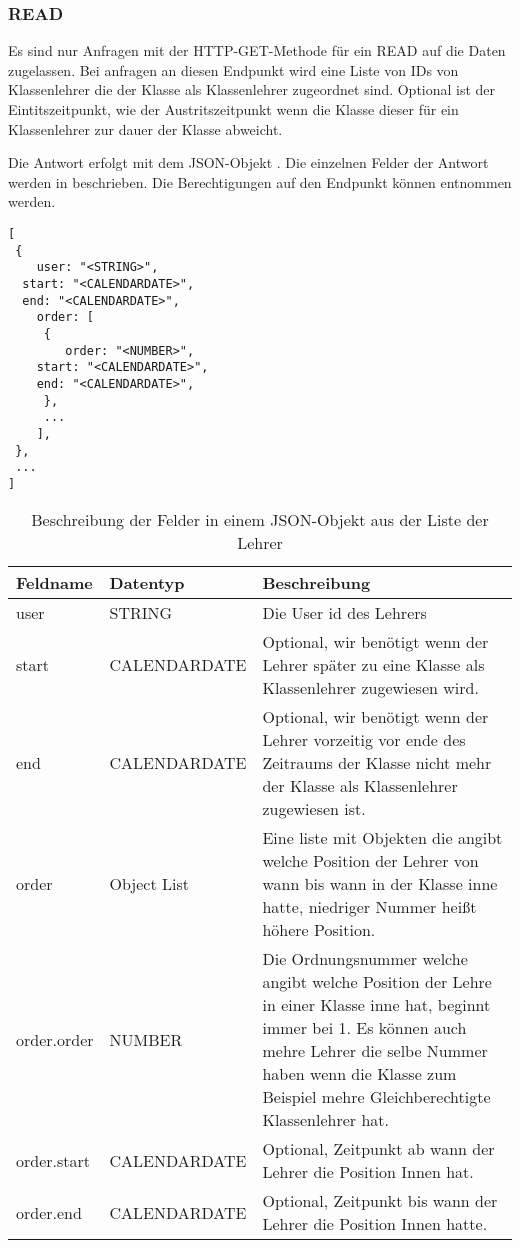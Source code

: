 \subsubsection{READ}
\label{sec:rest:api:classes:id:teachers:read}
Es sind nur Anfragen mit der HTTP-GET-Methode für ein READ auf die Daten zugelassen.
Bei anfragen an diesen Endpunkt wird eine Liste von IDs von Klassenlehrer die der Klasse als Klassenlehrer zugeordnet sind.
Optional ist der Eintitszeitpunkt, wie der Austritszeitpunkt wenn die Klasse dieser für ein Klassenlehrer zur dauer der Klasse abweicht.

Die Antwort erfolgt mit dem JSON-Objekt . 
Die einzelnen Felder der Antwort werden in  beschrieben.
Die Berechtigungen auf den Endpunkt können  entnommen werden.

\begin{lstlisting}[caption={JSON-Antwort für einen GET-Aufruf der Route /api/classes/\$id/teachers},label={lst:code:rest:api:classes:id:teachers:read:ret},frame=tlrb]
[ 
 { 
	user: "<STRING>",
  start: "<CALENDARDATE>",
  end: "<CALENDARDATE>",
	order: [
	 {
		order: "<NUMBER>",
    start: "<CALENDARDATE>",
    end: "<CALENDARDATE>",
	 },
	 ...
	],
 },
 ... 
]
\end{lstlisting}

\begin{longtable}{|p{}|p{}|p{}|}
		\caption{Beschreibung der Felder in einem JSON-Objekt aus der Liste der Lehrer}
\endfoot
		\caption{Beschreibung der Felder in einem JSON-Objekt aus der Liste der Lehrer}
		\label{tab:rest:api:classes:id:teachers:read:ret}
\endlastfoot 
\hline
			\textbf{Feldname} & \textbf{Datentyp} & \textbf{Beschreibung} \\ \hline
\endhead
user & STRING & Die User id des Lehrers \\ \hline
start & CALENDARDATE & Optional, wir benötigt wenn der Lehrer später zu eine Klasse als Klassenlehrer zugewiesen wird. \\ \hline
end & CALENDARDATE & Optional, wir benötigt wenn der Lehrer vorzeitig vor ende des Zeitraums der Klasse nicht mehr der Klasse als Klassenlehrer zugewiesen ist. \\ \hline
order & Object List & Eine liste mit Objekten die angibt welche Position der Lehrer von wann bis wann in der Klasse inne hatte, niedriger Nummer heißt höhere Position. \\ \hline
order.order & NUMBER & Die Ordnungsnummer welche angibt welche Position der Lehre in einer Klasse inne hat, beginnt immer bei 1. Es können auch mehre Lehrer die selbe Nummer haben wenn die Klasse zum Beispiel mehre Gleichberechtigte Klassenlehrer hat. \\ \hline
order.start & CALENDARDATE & Optional, Zeitpunkt ab wann der Lehrer die Position Innen hat. \\ \hline
order.end & CALENDARDATE & Optional, Zeitpunkt bis wann der Lehrer die Position Innen hatte. \\ \hline
\end{longtable}


